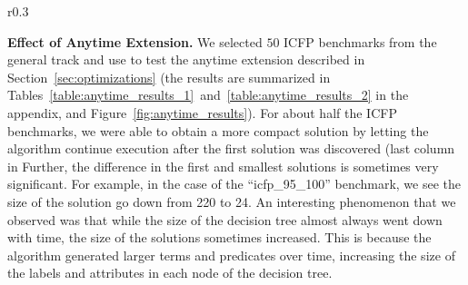 \documentclass{llncs}
\renewcommand{\paragraph}[1]{\par\noindent\textbf{#1.}}
\begin{document}
\begin{wrapfigure}{r}{0.3\textwidth}%
\centering
  \caption{Scatter plot of first vs. minimum size
    solutions with the anytime extension. Points below $x = y$ 
    benefit from the anytime extension.}
    \label{fig:anytime_results}
\vspace*{-2ex}
\end{wrapfigure}
\paragraph{Effect of Anytime Extension}
We selected $50$ ICFP benchmarks from the general track and use
to test the anytime extension described in Section~\ref{sec:optimizations}
(the results are summarized in
Tables~\ref{table:anytime_results_1}~and~\ref{table:anytime_results_2}
in the appendix, and Figure~\ref{fig:anytime_results}).
For about half the ICFP benchmarks, we were able to obtain a more
compact solution by letting the algorithm continue execution after the
first solution was discovered (last column in
Further, the difference in the first and
smallest solutions is sometimes very significant. For example, in the
case of the ``icfp\_95\_100'' benchmark, we see the size of the
solution go down from 220 to 24.
An interesting phenomenon that we observed was that while the size of
the decision tree almost always went down with time, the size of the
solutions sometimes increased.
This is because the algorithm generated larger terms and predicates
over time, increasing the size of the labels and attributes in each node
of the decision tree.

\end{document}
